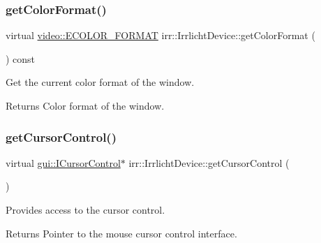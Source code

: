 \subsubsection{\texorpdfstring{get\+Color\+Format()}{getColorFormat()}\hspace{0.1cm}{\footnotesize\ttfamily [3/3]}}
{\footnotesize\ttfamily virtual \hyperlink{namespaceirr_1_1video_a1d5e487888c32b1674a8f75116d829ed}{video\+::\+E\+C\+O\+L\+O\+R\+\_\+\+F\+O\+R\+M\+AT} irr\+::\+Irrlicht\+Device\+::get\+Color\+Format (\begin{DoxyParamCaption}{ }\end{DoxyParamCaption}) const\hspace{0.3cm}{\ttfamily [pure virtual]}}



Get the current color format of the window. 

\begin{DoxyReturn}{Returns}
Color format of the window. 
\end{DoxyReturn}
\mbox{\label{classirr_1_1IrrlichtDevice_a500a3b7bf69487ff7e2075dd0b0db529}} 
\subsubsection{\texorpdfstring{get\+Cursor\+Control()}{getCursorControl()}\hspace{0.1cm}{\footnotesize\ttfamily [1/3]}}
{\footnotesize\ttfamily virtual \hyperlink{classirr_1_1gui_1_1ICursorControl}{gui\+::\+I\+Cursor\+Control}$\ast$ irr\+::\+Irrlicht\+Device\+::get\+Cursor\+Control (\begin{DoxyParamCaption}{ }\end{DoxyParamCaption})\hspace{0.3cm}{\ttfamily [pure virtual]}}



Provides access to the cursor control. 

\begin{DoxyReturn}{Returns}
Pointer to the mouse cursor control interface. 
\end{DoxyReturn}
\mbox{\label{classirr_1_1IrrlichtDevice_a500a3b7bf69487ff7e2075dd0b0db529}} 
